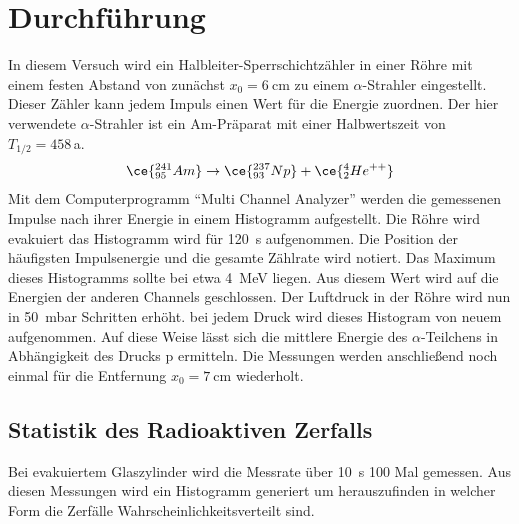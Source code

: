 \section{Durchführung}
In diesem Versuch wird ein Halbleiter-Sperrschichtzähler in einer Röhre mit einem festen Abstand von zunächst
$x_0 = \qty{6}{\cm}$ zu einem $\alpha$-Strahler eingestellt.
Dieser Zähler kann jedem Impuls einen Wert für die Energie zuordnen.
Der hier verwendete $\alpha$-Strahler ist ein Am-Präparat mit einer Halbwertszeit von $T_{1/2} = \num{458}$\,a.
\begin{align*}
    \ce{^{241}_{95}Am} \rightarrow \ce{^{237}_{93}Np}+ \ce{^{4}_{2}He^{++}}
\end{align*}
Mit dem Computerprogramm \enquote{Multi Channel Analyzer} werden die gemessenen Impulse 
nach ihrer Energie in einem Histogramm aufgestellt.
Die Röhre wird evakuiert das Histogramm wird für \qty{120}{\s} aufgenommen. 
Die Position der häufigsten Impulsenergie und die gesamte Zählrate wird notiert.
Das Maximum dieses Histogramms sollte bei etwa \qty{4}{\mega\electronvolt} liegen.
Aus diesem Wert wird auf die Energien der anderen Channels geschlossen.
Der Luftdruck in der Röhre wird nun in \qty{50}{\milli\bar} Schritten erhöht.
bei jedem Druck wird dieses Histogram von neuem aufgenommen.
Auf diese Weise lässt sich die mittlere Energie des $\alpha$-Teilchens in Abhängigkeit des Drucks p ermitteln.
Die Messungen werden anschließend noch einmal für die Entfernung $x_0 = \qty{7}{\cm}$ wiederholt.

\subsection{Statistik des Radioaktiven Zerfalls}
Bei evakuiertem Glaszylinder wird die Messrate über \qty{10}{\s} 100 Mal gemessen. 
Aus diesen Messungen wird ein Histogramm generiert um herauszufinden in welcher Form die Zerfälle Wahrscheinlichkeitsverteilt sind.